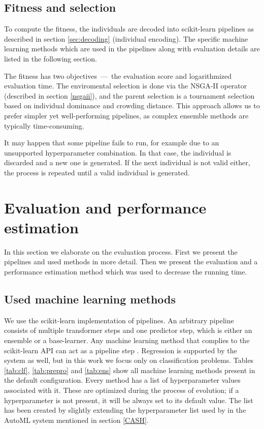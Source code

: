 \subsection{Fitness and selection} \label{sec:fitsel}
To compute the fitness, the individuals are decoded into scikit-learn 
pipelines as described in section \ref{sec:decoding} (individual encoding).
The specific machine learning methods which are used in the pipelines along
with evaluation details are listed in the following section.

The fitness has two objectives~---~the evaluation score and logarithmized
evaluation time. The enviromental selection is done via the NSGA-II operator
(described in section \ref{nsgaii}), and the 
parent selection is a tournament selection based on individual dominance and 
crowding distance. This approach allows us to prefer simpler yet
well-performing pipelines, as complex ensemble methods are typically
time-consuming. 

It may happen that some pipeline fails to run, for example due to an
unsupported hyperparameter combination. In that case, the individual is
discarded and a new one is generated. If the next individual is not valid
either, the process is repeated until a valid individual is generated.

\section{Evaluation and performance estimation} \label{genens:eval}
In this section we elaborate on the evaluation process. First we present the
pipelines and used methods in more detail. Then we present the evaluation and
a performance estimation method which was used to decrease the running time.

\subsection{Used machine learning methods} \label{tab03:methods}
We use the scikit-learn implementation of pipelines. An arbitrary pipeline
consists of multiple transformer steps and one predictor step, which is either
an ensemble or a base-learner. Any machine learning method that complies to the
scikit-learn API can act as a pipeline step \citep{sklearn_api}. Regression is
supported by the system as well, but in this work we focus only on
classification problems. Tables \ref{tab:clf}, \ref{tab:prepro} and
\ref{tab:ens} show all machine learning methods present in the default
configuration. Every method has a list of hyperparameter values associated
with it. These are optimized during the process of evolution;
if a hyperparameter is not present, it will be always set to its default value.
The list has been created by slightly extending the hyperparameter list 
used by \cite{Kren2017AutomaticCO} in the AutoML system mentioned in
section \ref{CASH}. 

